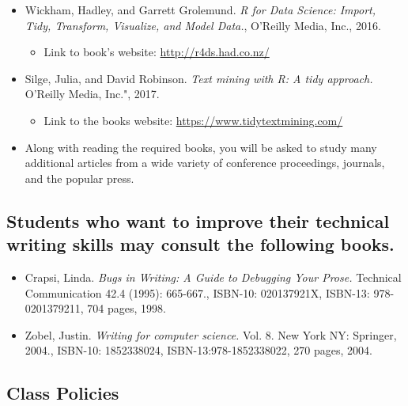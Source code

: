 \documentclass[11pt]{article} %
\begin{document}
\begin{itemize}

\item Wickham, Hadley, and Garrett Grolemund. \emph{R for Data Science: Import, Tidy, Transform, Visualize, and Model Data.}, O'Reilly Media, Inc., 2016.
	\begin{itemize}
		\item Link to book's website: \url{http://r4ds.had.co.nz/}
	\end{itemize}

\item Silge, Julia, and David Robinson. \emph{Text mining with R: A tidy approach.} O'Reilly Media, Inc.", 2017.
\begin{itemize}
	\item Link to the books website: \url{https://www.tidytextmining.com/}
\end{itemize}

\item Along with reading the required books, you will be asked to study many additional articles from a wide variety of conference proceedings, journals, and the popular press.

\end{itemize}


\subsection*{\textbf{Students who want to improve their technical writing skills may consult the following books.}}

\begin{itemize}

	\item Crapsi, Linda. \emph{Bugs in Writing: A Guide to Debugging Your Prose.} Technical Communication 42.4 (1995): 665-667.,  ISBN-10: 020137921X, ISBN-13: 978-0201379211, 704 pages, 1998.

	\item Zobel, Justin. \emph{Writing for computer science.} Vol. 8. New York NY: Springer, 2004.,  ISBN-10: 1852338024, ISBN-13:978-1852338022, 270 pages, 2004.

\end{itemize}



\subsection*{\textbf{Class Policies}}
\end{document}
